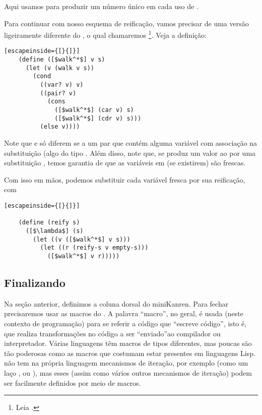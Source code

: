   \noindent Aqui usamos  para produzir um número
  único em cada uso de .

  Para continuar com nosso esquema de reificação, vamos precisar de
  uma versão ligeiramente diferente do , o qual
  chamaremos \footnote{Leia .}. Veja a definição:
  
  \begin{lstlisting}[escapeinside={[}{]}]
    (define ([$walk^*$] v s)
      (let (v (walk v s))
        (cond
          ((var? v) v)
          ((pair? v)
            (cons
              ([$walk^*$] (car v) s)
              ([$walk^*$] (cdr v) s)))
          (else v))))
  \end{lstlisting}

  Note que  e  só diferem se
    a um par que contém alguma
  variável com associação na substituição  (algo do tipo
  . Além disso,
  note que, se  produz um valor  ao
   por uma substituição , temos
  garantia de que as variáveis em  (se existirem) são frescas.

  Com isso em mãos, podemos substituir cada variável fresca por sua
  reificação, com

  \begin{lstlisting}[escapeinside={[}{]}]

    (define (reify s)
      ([$\lambda$] (s)
        (let ((v ([$walk^*$] v s)))
          (let ((r (reify-s v empty-s)))
            ([$walk^*$] v r)))))

  \end{lstlisting}



  \subsection{Finalizando}

  Na seção anterior, definimos a coluna dorsal do miniKanren. Para
  fechar precisaremos usar as macros do . A palavra
  ``macro'', no geral, é usada (neste contexto de programação) para se
  referir a código que ``escreve código'', isto é, que realiza
  transformações no código a ser ``enviado''ao compilador ou
  interpretador. Várias linguagens têm macros de tipos diferentes, mas
  poucas são tão poderosas como as macros que costumam estar presentes
  em linguagens Lisp.  não tem na própria linguagem
  mecanismos de iteração, por exemplo (como um laço ,
  ou ), mas esses (assim como vários outros
  mecanismos de iteração) podem ser facilmente definidos por meio de
  macros.

